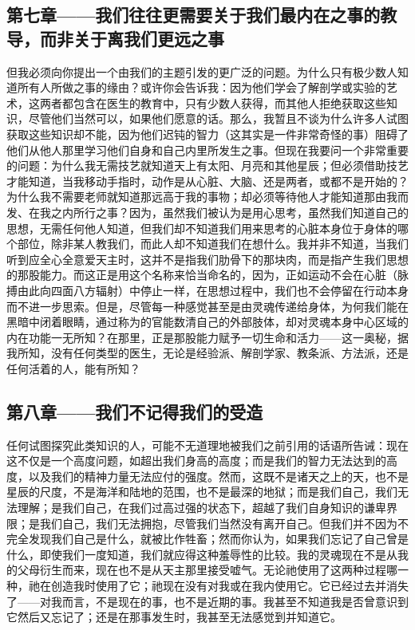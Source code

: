 
\subsection{第七章——我们往往更需要关于我们最内在之事的教导，而非关于离我们更远之事}

但我必须向你提出一个由我们的主题引发的更广泛的问题。为什么只有极少数人知道所有人所做之事的缘由？或许你会告诉我：因为他们学会了解剖学或实验的艺术，这两者都包含在医生的教育中，只有少数人获得，而其他人拒绝获取这些知识，尽管他们当然可以，如果他们愿意的话。那么，我暂且不谈为什么许多人试图获取这些知识却不能，因为他们迟钝的智力（这其实是一件非常奇怪的事）阻碍了他们从他人那里学习他们自身和自己内里所发生之事。但现在我要问一个非常重要的问题：为什么我无需技艺就知道天上有太阳、月亮和其他星辰；但必须借助技艺才能知道，当我移动手指时，动作是从心脏、大脑、还是两者，或都不是开始的？为什么我不需要老师就知道那远高于我的事物；却必须等待他人才能知道那由我而发、在我之内所行之事？因为，虽然我们被认为是用心思考，虽然我们知道自己的思想，无需任何他人知道，但我们却不知道我们用来思考的心脏本身位于身体的哪个部位，除非某人教我们，而此人却不知道我们在想什么。我并非不知道，当我们听到应全心全意爱天主时，这并不是指我们肋骨下的那块肉，而是指产生我们思想的那股能力。而这正是用这个名称来恰当命名的，因为，正如运动不会在心脏（脉搏由此向四面八方辐射）中停止一样，在思想过程中，我们也不会停留在行动本身而不进一步思索。但是，尽管每一种感觉甚至是由灵魂传递给身体，为何我们能在黑暗中闭着眼睛，通过称为的官能数清自己的外部肢体，却对灵魂本身中心区域的内在功能一无所知？在那里，正是那股能力赋予一切生命和活力——这一奥秘，据我所知，没有任何类型的医生，无论是经验派、解剖学家、教条派、方法派，还是任何活着的人，能有所知？\par


\subsection{第八章——我们不记得我们的受造}

任何试图探究此类知识的人，可能不无道理地被我们之前引用的话语所告诫：现在这不仅是一个高度问题，如超出我们身高的高度；而是我们的智力无法达到的高度，以及我们的精神力量无法应付的强度。然而，这既不是诸天之上的天，也不是星辰的尺度，不是海洋和陆地的范围，也不是最深的地狱；而是我们自己，我们无法理解；是我们自己，在我们过高过强的状态下，超越了我们自身知识的谦卑界限；是我们自己，我们无法拥抱，尽管我们当然没有离开自己。但我们并不因为不完全发现我们自己是什么，就被比作牲畜；然而你认为，如果我们忘记了自己曾是什么，即使我们一度知道，我们就应得这种羞辱性的比较。我的灵魂现在不是从我的父母衍生而来，现在也不是从天主那里接受嘘气。无论祂使用了这两种过程哪一种，祂在创造我时使用了它；祂现在没有对我或在我内使用它。它已经过去并消失了——对我而言，不是现在的事，也不是近期的事。我甚至不知道我是否曾意识到它然后又忘记了；还是在那事发生时，我甚至无法感觉到并知道它。\par

